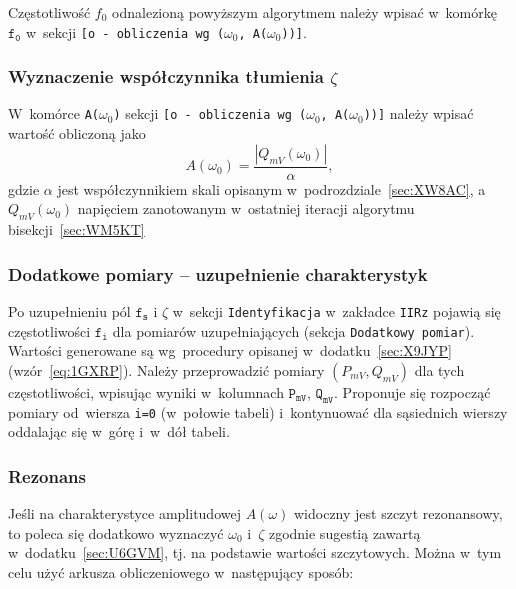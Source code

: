 \documentclass[paper=a4,DIV=12]{lpas}
\begin{document}
Częstotliwość $f_0$ odnalezioną powyższym algorytmem należy wpisać
w~komórkę $\texttt{f}_\texttt{0}$ w~sekcji \texttt{[o - o\-bli\-cze\-nia wg
($\omega_0$, A($\omega_0$))]}.

\subsubsection{Wyznaczenie współczynnika tłumienia \texorpdfstring{$\zeta$}{ζ}}
\label{eq:A20W9}

W~komórce \texttt{A($\omega_0$)} sekcji \texttt{[o - obliczenia wg ($\omega_0$,
A($\omega_0$))]} należy wpisać wartość obliczoną jako
\begin{equation}
  A(\omega_0) = \frac{|Q_{mV}(\omega_0)|}{\alpha},
  \label{eq:A7ZD6}
\end{equation}
gdzie $\alpha$ jest współczynnikiem skali opisanym
w~podrozdziale~\ref{sec:XW8AC}, a~$Q_{mV}(\omega_0)$ napięciem zanotowanym
w~ostatniej iteracji algorytmu bisekcji~\ref{sec:WM5KT}


\subsubsection{Dodatkowe pomiary -- uzupełnienie charakterystyk}
\label{sec:09H54}

Po uzupełnieniu pól $\texttt{f}_\texttt{s}$ i $\zeta$ w~sekcji
\texttt{Identyfikacja} w~zakładce \texttt{IIRz} pojawią się częstotliwości
$\texttt{f}_\texttt{i}$ dla pomiarów uzupełniających (sekcja \texttt{Dodatkowy
pomiar}). Wartości generowane są wg~procedury opisanej w~dodatku~\ref{sec:X9JYP}
(wzór~\eqref{eq:1GXRP}). Należy przeprowadzić pomiary $(P_{mV}, Q_{mV})$ dla
tych częstotliwości, wpisując wyniki w~kolumnach $\texttt{P}_\texttt{mV}$,
$\texttt{Q}_\texttt{mV}$. Proponuje się rozpocząć pomiary od~wiersza
\texttt{i=0} (w~połowie tabeli) i~kontynuować dla sąsiednich wierszy oddalając
się w~górę i~w~dół tabeli.

\subsubsection{Rezonans}
\label{sec:0NZQS}

Jeśli na charakterystyce amplitudowej $A(\omega)$ widoczny jest szczyt
rezonansowy, to poleca się dodatkowo wyznaczyć $\omega_0$ i~$\zeta$ zgodnie
sugestią zawartą w~dodatku~\ref{sec:U6GVM}, tj. na podstawie wartości
szczytowych. Można w~tym celu użyć arkusza obliczeniowego w~następujący sposób:
\end{document}
